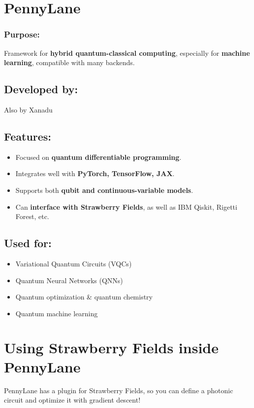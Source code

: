 \documentclass[12]{article}
\begin{document}
\section*{ PennyLane}
\subsubsection*{Purpose:} Framework for \textbf{hybrid quantum-classical computing}, especially for \textbf{machine learning}, compatible with many backends.
 \subsection*{ Developed by:}
 Also by Xanadu
 \subsection*{ Features:}
 \begin{itemize}
 	\item Focused on \textbf{quantum differentiable programming}.
 	\item Integrates well with \textbf{PyTorch, TensorFlow, JAX}.
 	\item Supports both \textbf{qubit and continuous-variable models}.
 	\item Can \textbf{interface with Strawberry Fields}, as well as IBM Qiskit, Rigetti Forest, etc.
 \end{itemize}
\subsection*{ Used for:}
\begin{itemize}
	\item Variational Quantum Circuits (VQCs)
	\item Quantum Neural Networks (QNNs)
	\item Quantum optimization \& quantum chemistry
	\item Quantum machine learning
\end{itemize}	

\section*{ Using Strawberry Fields inside PennyLane}
PennyLane has a plugin for Strawberry Fields, so you can define a photonic circuit and optimize it with gradient descent!
\end{document}
